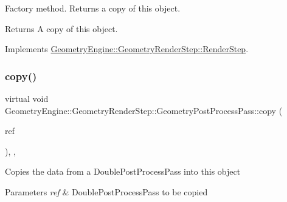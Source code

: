 Factory method. Returns a copy of this object. \begin{DoxyReturn}{Returns}
A copy of this object. 
\end{DoxyReturn}


Implements \mbox{\hyperlink{class_geometry_engine_1_1_geometry_render_step_1_1_render_step_afe33ea9d82c5be11f55af7d39691d44b}{Geometry\+Engine\+::\+Geometry\+Render\+Step\+::\+Render\+Step}}.

\mbox{\label{class_geometry_engine_1_1_geometry_render_step_1_1_geometry_post_process_pass_a9bd55bb78722a0b6dc30910654b159b5}} 
\subsubsection{\texorpdfstring{copy()}{copy()}}
{\footnotesize\ttfamily virtual void Geometry\+Engine\+::\+Geometry\+Render\+Step\+::\+Geometry\+Post\+Process\+Pass\+::copy (\begin{DoxyParamCaption}\item[{const \mbox{\hyperlink{class_geometry_engine_1_1_geometry_render_step_1_1_geometry_post_process_pass}{Geometry\+Post\+Process\+Pass}} \&}]{ref }\end{DoxyParamCaption})\hspace{0.3cm}{\ttfamily [inline]}, {\ttfamily [protected]}, {\ttfamily [virtual]}}

Copies the data from a Double\+Post\+Process\+Pass into this object 
\begin{DoxyParams}{Parameters}
{\em ref} & Double\+Post\+Process\+Pass to be copied \\
\hline
\end{DoxyParams}
\mbox{\label{class_geometry_engine_1_1_geometry_render_step_1_1_geometry_post_process_pass_aad8136ef6518e5da3cc5c3bc7f588ab5}} 
